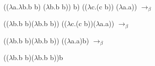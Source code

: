 
{(($\lambda$a.$\lambda$b.b b) ($\lambda$b.b b)) b) (($\lambda$c.(c b)) ($\lambda$a.a)) $\rightarrow_\beta$\par (($\lambda$b.b b)($\lambda$b.b b)) (($\lambda$c.(c b))($\lambda$a.a)) $\rightarrow_\beta$\par(($\lambda$b.b b)($\lambda$b.b b)) (($\lambda$a.a)b) $\rightarrow_\beta$\par (($\lambda$b.b b)($\lambda$b.b b))b }

